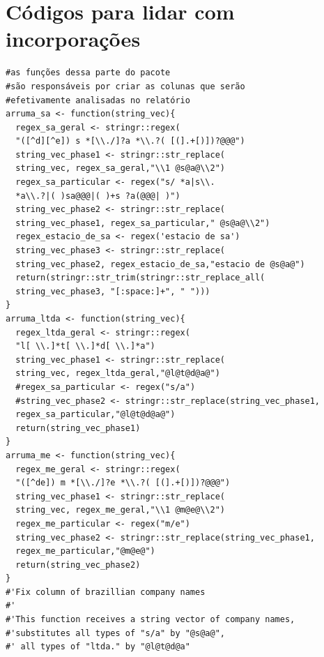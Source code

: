 \documentclass[]{report}
\begin{document}
\chapter{Códigos para lidar com incorporações}\label{codpj}

\footnotesize

\begin{verbatim}
#as funções dessa parte do pacote
#são responsáveis por criar as colunas que serão
#efetivamente analisadas no relatório
arruma_sa <- function(string_vec){
  regex_sa_geral <- stringr::regex(
  "([^d][^e]) s *[\\./]?a *\\.?( [(].+[)])?@@@")
  string_vec_phase1 <- stringr::str_replace(
  string_vec, regex_sa_geral,"\\1 @s@a@\\2")
  regex_sa_particular <- regex("s/ *a|s\\.
  *a\\.?|( )sa@@@|( )+s ?a(@@@| )")
  string_vec_phase2 <- stringr::str_replace(
  string_vec_phase1, regex_sa_particular," @s@a@\\2")
  regex_estacio_de_sa <- regex('estacio de sa')
  string_vec_phase3 <- stringr::str_replace(
  string_vec_phase2, regex_estacio_de_sa,"estacio de @s@a@")
  return(stringr::str_trim(stringr::str_replace_all(
  string_vec_phase3, "[:space:]+", " ")))
}
arruma_ltda <- function(string_vec){
  regex_ltda_geral <- stringr::regex(
  "l[ \\.]*t[ \\.]*d[ \\.]*a")
  string_vec_phase1 <- stringr::str_replace(
  string_vec, regex_ltda_geral,"@l@t@d@a@")
  #regex_sa_particular <- regex("s/a")
  #string_vec_phase2 <- stringr::str_replace(string_vec_phase1,
  regex_sa_particular,"@l@t@d@a@")
  return(string_vec_phase1)
}
arruma_me <- function(string_vec){
  regex_me_geral <- stringr::regex(
  "([^de]) m *[\\./]?e *\\.?( [(].+[)])?@@@")
  string_vec_phase1 <- stringr::str_replace(
  string_vec, regex_me_geral,"\\1 @m@e@\\2")
  regex_me_particular <- regex("m/e")
  string_vec_phase2 <- stringr::str_replace(string_vec_phase1,
  regex_me_particular,"@m@e@")
  return(string_vec_phase2)
}
#'Fix column of brazillian company names
#'
#'This function receives a string vector of company names,
#'substitutes all types of "s/a" by "@s@a@",
#' all types of "ltda." by "@l@t@d@a"

\end{verbatim}
\end{document}
